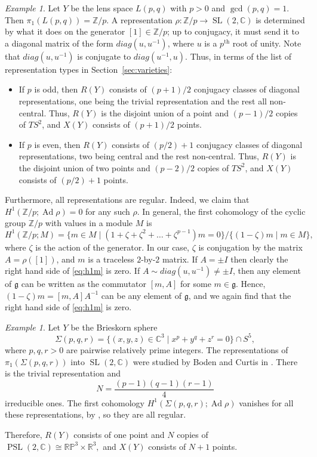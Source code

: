 \documentclass [11pt]{amsart}
\theoremstyle{remark}
\newtheorem {example}[theorem]{Example}
\def\zz {{\mathbb{Z}}}
\def\rr {{\mathbb{R}}}
\def\cc {{\mathbb{C}}}
\def\C{\cc}
\def\R{\rr}
\def\Z {\zz}
\def\rp {\mathbb{RP}}
\def\g{\mathfrak{g}}
\def\sl {{\operatorname{SL}(2, \cc)}}
\def\psl {{\operatorname{PSL}(2, \cc)}}
\def\Rep {R}
\def\Ad {\operatorname{Ad}}
\def\Char {X}
\begin{document}
\begin{example}
\label{ex:Lpq}
Let $Y$ be the lens space $L(p,q)$ with $p > 0$ and $\gcd(p,q) = 1.$ Then $\pi_1(L(p,q)) = \Z/p$. A representation $\rho: \Z/p \to \sl$ is determined by what it does on the generator $[1]\in \Z/p$; up to conjugacy, it must send it to a diagonal matrix of the form $\textit{diag}(u, u^{-1})$, where $u$ is a $p^{\text{th}}$ root of unity. Note that $\textit{diag}(u, u^{-1})$ is conjugate to $\textit{diag}(u^{-1}, u)$. Thus, in terms of the list of representation types in Section~\ref{sec:varieties}:
\begin{itemize}
\item If $p$ is odd, then $R(Y)$ consists of $(p+1)/2$ conjugacy classes of diagonal representations, one being the trivial representation and the rest all non-central.  Thus, $R(Y)$ is the disjoint union of a point and $(p-1)/2$ copies of $TS^2$, and $X(Y)$ consists of $(p+1)/2$ points.
\item If $p$ is even, then $R(Y)$ consists of $(p/2)+1$ conjugacy classes of diagonal representations, two being central and the rest non-central.  Thus, $R(Y)$ is the disjoint union of two points and $(p-2)/2$ copies of $TS^2$, and $X(Y)$ consists of $(p/2)+1$ points.
\end{itemize}
Furthermore, all representations are regular. Indeed, we claim that $H^1(\Z/p; \Ad \rho)=0$ for any such $\rho$. In general, the first cohomology of the cyclic group $\Z/p$ with values in a module $M$ is 
\begin{equation}
\label{eq:h1m}
H^1(\Z/p; M) = \{ m \in M \mid (1+\zeta + \zeta^2 + \dots + \zeta^{p-1})m=0\} / \{(1-\zeta)m \mid m \in M\},
\end{equation}
where $\zeta$ is the action of the generator. In our case, $\zeta$ is conjugation by the matrix $A=\rho([1])$, and $m$ is a traceless $2$-by-$2$ matrix. If $A=\pm I$ then clearly the right hand side of \eqref{eq:h1m} is zero. If $A \sim \textit{diag}(u, u^{-1}) \neq \pm I$, then any element of $\g$ can be written as the commutator $[m, A]$ for some $m \in \g$. Hence, $(1-\zeta)m = [m, A] A^{-1}$ can be any element of $\g$, and we again find that the right hand side of \eqref{eq:h1m} is zero.
\end{example}


\begin{example}
\label{ex:Br3}
Let $Y$ be the Brieskorn sphere
$$\Sigma(p,q,r) = \{(x, y, z) \in \C^3 \mid x^p + y^q + z^r = 0 \} \cap S^5,$$
where $p, q, r > 0$ are pairwise relatively prime integers. The representations of $\pi_1(\Sigma(p,q,r))$ into $\sl$ were studied by Boden and Curtis in \cite[Section 3]{BodenCurtis}. There is the trivial representation and 
$$N = \frac{(p-1)(q-1)(r-1)}{4}$$
irreducible ones. The first cohomology $H^1(\Sigma(p,q,r); \Ad \rho)$ vanishes for all these representations, by \cite[Lemma 2.4]{BodenCurtis}, so they are all regular. 

Therefore, $\Rep(Y)$ consists of one point and $N$ copies of $\psl \cong \rp^3 \times \R^3,$ and $\Char(Y)$ consists of $N+1$ points. 
\end{example}
\end{document}
